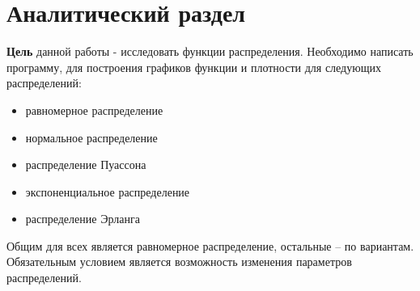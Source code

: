 \chapter{Аналитический раздел}

\textbf{Цель} данной работы - исследовать функции распределения. Необходимо написать программу, для построения графиков функции и плотности для следующих распределений:
\begin{itemize}
	\item равномерное распределение
	\item нормальное распределение
	\item распределение Пуассона
	\item экспоненциальное распределение
	\item распределение Эрланга
\end{itemize}

Общим для всех является равномерное распределение, остальные – по вариантам. Обязательным условием является возможность изменения параметров распределений.